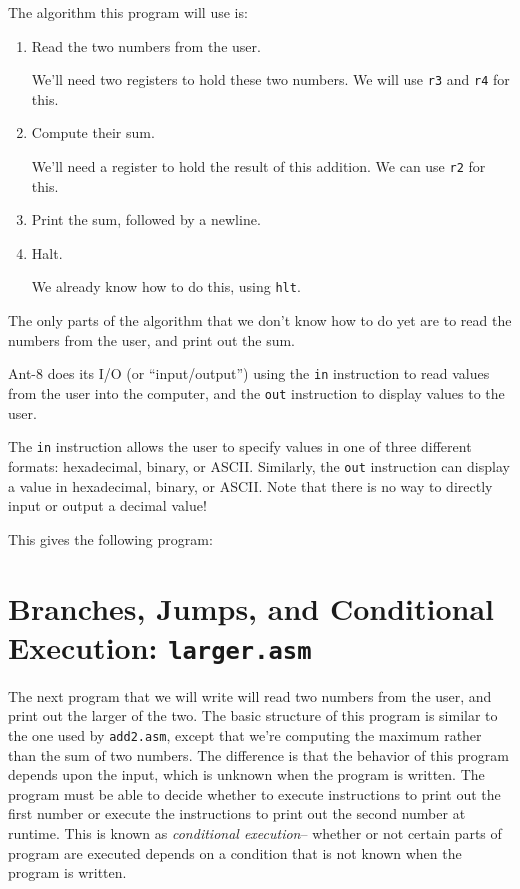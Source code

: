The algorithm this program will use is:
\begin{enumerate}

\item   Read the two numbers from the user.

        We'll need two registers to hold these two numbers.  We will use
        {\tt r3} and {\tt r4} for this.

\item   Compute their sum.

        We'll need a register to hold the result of this addition.  We
        can use {\tt r2} for this.

\item   Print the sum, followed by a newline.

\item   Halt.

	We already know how to do this, using {\tt hlt}.

\end{enumerate}

The only parts of the algorithm that we don't know how to do yet are
to read the numbers from the user, and print out the sum. 

{\sc Ant-8} does its I/O (or ``input/output'') using the {\tt in}
instruction to read values from the user into the computer, and
the {\tt out} instruction to display values to the user.

The {\tt in} instruction allows the user to specify values in
one of three different formats:  hexadecimal, binary, or
{\sc ASCII}.  Similarly, the {\tt out} instruction can display a
value in hexadecimal, binary, or {\sc ASCII}.  Note that there is no
way to directly input or output a decimal value!

This gives the following program:



\section{Branches, Jumps, and Conditional Execution: {\tt larger.asm}}

The next program that we will write will read two numbers from the
user, and print out the larger of the two.  The basic structure of
this program is similar to the one used by {\tt add2.asm}, except
that we're computing the maximum rather than the sum of two numbers. 
The difference is that the behavior of this program depends upon the
input, which is unknown when the program is written.
The program must be able to
decide whether to execute instructions to print out the first number
or execute the instructions to print out the second number at runtime. 
This is known as {\em conditional execution}-- whether or not certain
parts of program are executed depends on a condition that is not known
when the program is written.

